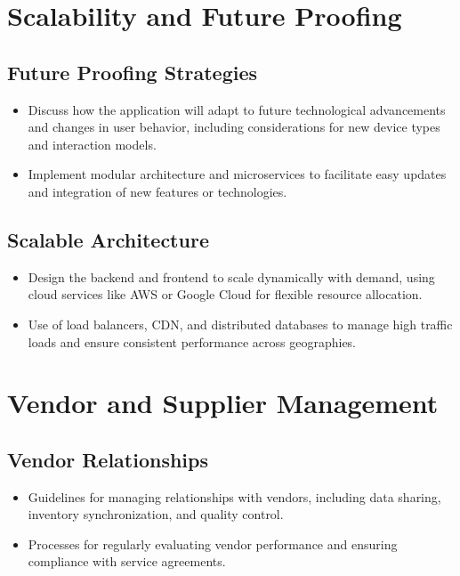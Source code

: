 \documentclass[11pt]{article}
\begin{document}
	\section*{Scalability and Future Proofing}
	
	\subsection*{Future Proofing Strategies}
	\begin{itemize}
		\item Discuss how the application will adapt to future technological advancements and changes in user behavior, including considerations for new device types and interaction models.
		\item Implement modular architecture and microservices to facilitate easy updates and integration of new features or technologies.
	\end{itemize}
	
	\subsection*{Scalable Architecture}
	\begin{itemize}
		\item Design the backend and frontend to scale dynamically with demand, using cloud services like AWS or Google Cloud for flexible resource allocation.
		\item Use of load balancers, CDN, and distributed databases to manage high traffic loads and ensure consistent performance across geographies.
	\end{itemize}
	
	\section*{Vendor and Supplier Management}
	
	\subsection*{Vendor Relationships}
	\begin{itemize}
		\item Guidelines for managing relationships with vendors, including data sharing, inventory synchronization, and quality control.
		\item Processes for regularly evaluating vendor performance and ensuring compliance with service agreements.
	\end{itemize}
	
\end{document}
